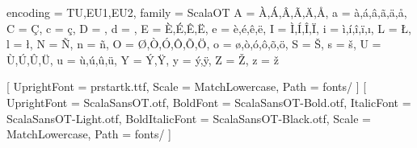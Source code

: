 \usepackage[utf8]{luainputenc}



\usepackage[
    margin          = 0.75in, 
    paperwidth      = 6.25in, 
    paperheight     = 9.25in,
    bindingoffset   = 0.25in,
    layoutvoffset   = 0.125in,
    asymmetric
]{geometry}

\usepackage{amsmath,amsfonts,amssymb,amsthm,commath,amsgen,mathtools,scalerel,textcomp,siunitx}

\usepackage{microtype}
\usepackage{fontspec}

\usepackage{imakeidx}
\makeindex[columns=2, title=Index]

\usepackage{fontawesome}

\DeclareCharacterInheritance
   { encoding = {TU,EU1,EU2},
     family   = {ScalaOT} }
   { A = {\`A,\'A,\^A,\~A,\"A,\r A},
     a = {\`a,\'a,\^a,\~a,\"a,\r a},
     C = {\c C},
     c = {\c c},
     D = {\DH},
     d = {\dj},
     E = {\`E,\'E,\^E,\"E},
     e = {\`e,\'e,\^e,\"e},
     I = {\`I,\'I,\^I,\"I},
     i = {\`i,\'i,\^i,\"i,\i},
     L = {\L},
     l = {\l},
     N = {\~N},
     n = {\~n},
     O = {\O,\`O,\'O,\^O,\~O,\"O},
     o = {\o,\`o,\'o,\^o,\~o,\"o},
     S = {\v S},
     s = {\v s},
     U = {\`U,\'U,\^U,\"U},
     u = {\`u,\'u,\^u,\"u},
     Y = {\'Y,\"Y},
     y = {\'y,\"y},
     Z = {\v Z},
     z = {\v z}
   }

\usepackage[math-style=ISO]{unicode-math}
\usepackage{lualatex-math}

\setmonofont{PressStart}[
    UprightFont    =  prstartk.ttf,
    Scale          =  MatchLowercase,
    Path           =  fonts/
]
\setmainfont{ScalaSansOT}[
    UprightFont    =  ScalaSansOT.otf,
    BoldFont       =  ScalaSansOT-Bold.otf,
    ItalicFont     =  ScalaSansOT-Light.otf,
    BoldItalicFont =  ScalaSansOT-Black.otf,
    Scale          =  MatchLowercase,
    Path           =  fonts/
]

\usepackage{fancyhdr}


\usepackage{tikz}
\usetikzlibrary{shapes,arrows}
\usepackage{pgfplots}
\pgfplotsset{width=4.0cm}
\pgfplotsset{compat=newest}
\usetikzlibrary{patterns}
\usetikzlibrary{intersections}
\usetikzlibrary{calc,positioning}
\usetikzlibrary{shapes.misc,calc}
\usepackage{relsize}

